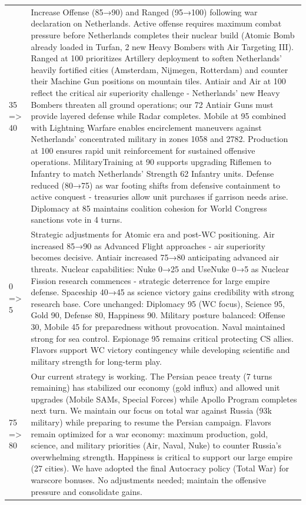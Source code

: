 \begin{longtable}{p{}p{}}
35 => 40 & Increase Offense (85→90) and Ranged (95→100) following war declaration on Netherlands. Active offense requires maximum combat pressure before Netherlands completes their nuclear build (Atomic Bomb already loaded in Turfan, 2 new Heavy Bombers with Air Targeting III). Ranged at 100 prioritizes Artillery deployment to soften Netherlands' heavily fortified cities (Amsterdam, Nijmegen, Rotterdam) and counter their Machine Gun positions on mountain tiles. Antiair and Air at 100 reflect the critical air superiority challenge - Netherlands' new Heavy Bombers threaten all ground operations; our 72 Antiair Guns must provide layered defense while Radar completes. Mobile at 95 combined with Lightning Warfare enables encirclement maneuvers against Netherlands' concentrated military in zones 1058 and 2782. Production at 100 ensures rapid unit reinforcement for sustained offensive operations. MilitaryTraining at 90 supports upgrading Riflemen to Infantry to match Netherlands' Strength 62 Infantry units. Defense reduced (80→75) as war footing shifts from defensive containment to active conquest - treasuries allow unit purchases if garrison needs arise. Diplomacy at 85 maintains coalition cohesion for World Congress sanctions vote in 4 turns. \\
0 => 5 & Strategic adjustments for Atomic era and post-WC positioning. Air increased 85→90 as Advanced Flight approaches - air superiority becomes decisive. Antiair increased 75→80 anticipating advanced air threats. Nuclear capabilities: Nuke 0→25 and UseNuke 0→5 as Nuclear Fission research commences - strategic deterrence for large empire defense. Spaceship 40→45 as science victory gains credibility with strong research base. Core unchanged: Diplomacy 95 (WC focus), Science 95, Gold 90, Defense 80, Happiness 90. Military posture balanced: Offense 30, Mobile 45 for preparedness without provocation. Naval maintained strong for sea control. Espionage 95 remains critical protecting CS allies. Flavors support WC victory contingency while developing scientific and military strength for long-term play. \\
75 => 80 & Our current strategy is working. The Persian peace treaty (7 turns remaining) has stabilized our economy (gold influx) and allowed unit upgrades (Mobile SAMs, Special Forces) while Apollo Program completes next turn. We maintain our focus on total war against Russia (93k military) while preparing to resume the Persian campaign. Flavors remain optimized for a war economy: maximum production, gold, science, and military priorities (Air, Naval, Nuke) to counter Russia's overwhelming strength. Happiness is critical to support our large empire (27 cities). We have adopted the final Autocracy policy (Total War) for warscore bonuses. No adjustments needed; maintain the offensive pressure and consolidate gains. \\

\end{longtable}
